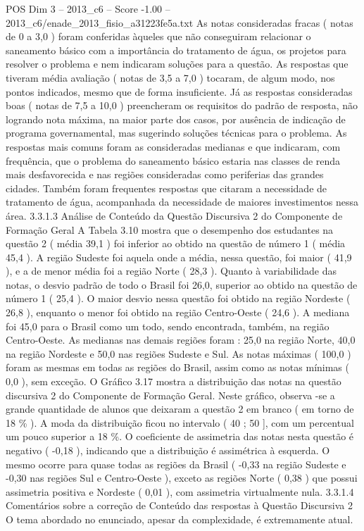 \begin{textsample}{POS Dim 3 – 2013\_c6 – Score -1.00 – 2013\_c6/enade\_2013\_fisio\_a31223fe5a.txt}
As notas consideradas fracas ( notas de 0 a 3,0 ) foram conferidas àqueles que não conseguiram relacionar o saneamento básico com a importância do tratamento de água, os projetos para resolver o problema e nem indicaram soluções para a questão.
As respostas que tiveram média avaliação ( notas de 3,5 a 7,0 ) tocaram, de algum modo, nos pontos indicados, mesmo que de forma insuficiente.
Já as respostas consideradas boas ( notas de 7,5 a 10,0 ) preencheram os requisitos do padrão de resposta, não logrando nota máxima, na maior parte dos casos, por ausência de indicação de programa governamental, mas sugerindo soluções técnicas para o problema.
As respostas mais comuns foram as consideradas medianas e que indicaram, com frequência, que o problema do saneamento básico estaria nas classes de renda mais desfavorecida e nas regiões consideradas como periferias das grandes cidades.
Também foram frequentes respostas que citaram a necessidade de tratamento de água, acompanhada da necessidade de maiores investimentos nessa área. 3.3.1.3 Análise de Conteúdo da Questão Discursiva 2 do Componente de Formação Geral A Tabela 3.10 mostra que o desempenho dos estudantes na questão 2 ( média 39,1 ) foi inferior ao obtido na questão de número 1 ( média 45,4 ).
A região Sudeste foi aquela onde a média, nessa questão, foi maior ( 41,9 ), e a de menor média foi a região Norte ( 28,3 ).
Quanto à variabilidade das notas, o desvio padrão de todo o Brasil foi 26,0, superior ao obtido na questão de número 1 ( 25,4 ).
O maior desvio nessa questão foi obtido na região Nordeste ( 26,8 ), enquanto o menor foi obtido na região Centro-Oeste ( 24,6 ).
A mediana foi 45,0 para o Brasil como um todo, sendo encontrada, também, na região Centro-Oeste.
As medianas nas demais regiões foram : 25,0 na região Norte, 40,0 na região Nordeste e 50,0 nas regiões Sudeste e Sul.
As notas máximas ( 100,0 ) foram as mesmas em todas as regiões do Brasil, assim como as notas mínimas ( 0,0 ), sem exceção.
O Gráfico 3.17 mostra a distribuição das notas na questão discursiva 2 do Componente de Formação Geral.
Neste gráfico, observa -se a grande quantidade de alunos que deixaram a questão 2 em branco ( em torno de 18 \% ).
A moda da distribuição ficou no intervalo ( 40 ; 50 ], com um percentual um pouco superior a 18 \%.
O coeficiente de assimetria das notas nesta questão é negativo ( -0,18 ), indicando que a distribuição é assimétrica à esquerda.
O mesmo ocorre para quase todas as regiões da Brasil ( -0,33 na região Sudeste e -0,30 nas regiões Sul e Centro-Oeste ), exceto as regiões Norte ( 0,38 ) que possui assimetria positiva e Nordeste ( 0,01 ), com assimetria virtualmente nula. 3.3.1.4 Comentários sobre a correção de Conteúdo das respostas à Questão Discursiva 2 O tema abordado no enunciado, apesar da complexidade, é extremamente atual.

\end{textsample}
